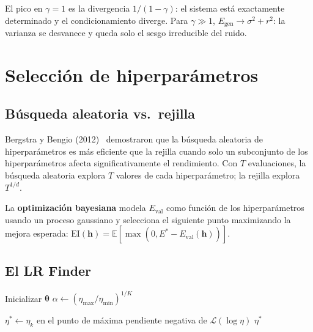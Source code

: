 El pico en $\gamma = 1$ es la divergencia $1/(1-\gamma)$: el sistema
está exactamente determinado y el condicionamiento diverge. Para
$\gamma \gg 1$, $E_{\text{gen}} \to \sigma^2 + r^2$: la varianza se
desvanece y queda solo el sesgo irreducible del ruido.

\section{Selección de hiperparámetros}
\label{sec:hiperparametros}


\subsection{Búsqueda aleatoria vs.\ rejilla}
\label{subsec:busqueda}

Bergstra y Bengio (2012)~\cite{bergstra2012random} demostraron que la
búsqueda aleatoria de hiperparámetros es más eficiente que la rejilla
cuando solo un subconjunto de los hiperparámetros afecta
significativamente el rendimiento. Con $T$ evaluaciones, la búsqueda
aleatoria explora $T$ valores de cada hiperparámetro; la rejilla explora
$T^{1/d}$.

La \textbf{optimización bayesiana} modela $E_{\text{val}}$ como función
de los hiperparámetros usando un proceso gaussiano y selecciona el
siguiente punto maximizando la mejora esperada:
$\text{EI}(\bm{h}) = \mathbb{E}[\max(0, E^* - E_{\text{val}}(\bm{h}))]$.

\subsection{El LR Finder}
\label{subsec:lr_finder}

\begin{algorithm}[H]
\caption{Learning Rate Finder (Smith, 2017)}
\label{alg:lr_finder}

Inicializar $\bm{\theta}$\;
$\alpha \leftarrow (\eta_{\max}/\eta_{\min})^{1/K}$


$\eta^* \leftarrow \eta_k$ en el punto de máxima pendiente negativa
de $\mathcal{L}(\log\eta)$\;
\Return $\eta^*$\;
\end{algorithm}

